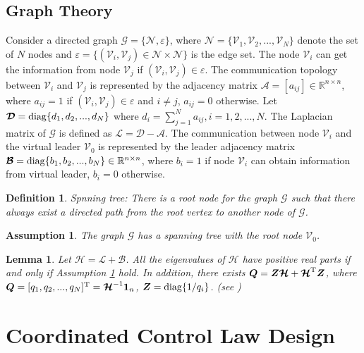 \documentclass[english]{cccconf}
\newtheorem{definition}{Definition}
\newtheorem{lemma}{Lemma}
\newtheorem{assumption}{Assumption}
\begin{document}
\subsection{Graph Theory}

Consider a directed graph $\mathcal{G}=\{\mathcal{N},\varepsilon\}$, where $\mathcal{N}=\{\mathcal{V}_1,\mathcal{V}_2,...,\mathcal{V}_N\}$ denote the set of $N$ nodes and $\varepsilon=\{(\mathcal{V}_i,\mathcal{V}_j)\in \mathcal{N}\times \mathcal{N}\}$ is the edge set. The node $\mathcal{V}_i$ can get the information from node $\mathcal{V}_j$ if $(\mathcal{V}_i,\mathcal{V}_j)\in \varepsilon$. The communication topology between $\mathcal{V}_i$ and $\mathcal{V}_j$ is represented by the adjacency matrix $\bm{\mathcal{A}}=[a_{ij}]\in \mathbb{R}^{n\times n}$, where $a_{ij}=1$ if $(\mathcal{V}_i,\mathcal{V}_j)\in \varepsilon$ and $i\neq j$, $a_{ij}=0$ otherwise. Let $\bm{\mathcal{D}}={\rm diag}\{d_1,d_2,...,d_N\}$ where $d_i=\sum^N_{j=1}a_{ij},i=1,2,...,N$. The Laplacian matrix of $\mathcal{G}$ is defined as $\bm{\mathcal{L}}=\bm{\mathcal{D}}-\bm{\mathcal{A}}$. The communication between node $\mathcal{V}_i$ and the virtual leader $\mathcal{V}_0$ is represented by the leader adjacency matrix $\bm{\mathcal{B}}={\rm diag}\{b_1,b_2,...,b_N\}\in \mathbb{R}^{n\times n}$, where $b_i=1$ if node $\mathcal{V}_i$ can obtain information from virtual leader, $b_i=0$ otherwise. 

\begin{definition}
	Spnning tree: There is a root node for the graph $\mathcal{G}$ such that there always exist a directed path from the root vertex to another node of $\mathcal{G}$.  
\end{definition}

\begin{assumption}\label{assumption}
	The graph $\mathcal{G}$ has a spanning tree with the root node $\mathcal{V}_0$.
\end{assumption}

\begin{lemma}\label{lemma}
	Let $\bm{\mathcal{H}}=\bm{\mathcal{L}}+\bm{\mathcal{B}}$. All the eigenvalues of $\bm{\mathcal{H}}$ have positive real parts if and only if Assumption \ref{assumption} hold. In addition, there exists $\bm{Q}=\bm{Z}\bm{\mathcal{H}}+\bm{\mathcal{H}}^{\rm T}\bm{Z}$, where $\bm{Q}=[q_1,q_2,...,q_N]^{\rm T}=\bm{\mathcal{H}}^{-1}\bm{1}_n$, $\bm{Z}={\rm diag}\{1/q_i\}$. {\rm (see \cite{bib14,bib15})}
\end{lemma} 


\section{Coordinated Control Law Design}
\end{document}
